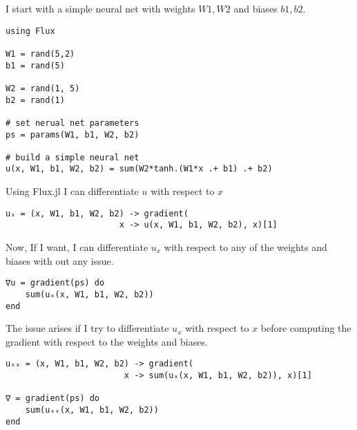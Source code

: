 \documentclass[12pt]{article}
\begin{document}
\begin{flushleft}

I start with a simple neural net with weights $W1, W2$ and biases $b1, b2$.
\begin{mdframed}[backgroundcolor=bg]
\begin{verbatim}
using Flux

W1 = rand(5,2)
b1 = rand(5)

W2 = rand(1, 5)
b2 = rand(1)

# set nerual net parameters
ps = params(W1, b1, W2, b2)

# build a simple neural net
u(x, W1, b1, W2, b2) = sum(W2*tanh.(W1*x .+ b1) .+ b2)

\end{verbatim}
\end{mdframed}

\vspace{0.25cm}

Using Flux.jl I can differentiate $u$ with respect to $x$ 
\vspace{0.25cm}

\begin{mdframed}[backgroundcolor=bg]
\begin{verbatim}
uₓ = (x, W1, b1, W2, b2) -> gradient(
                       x -> u(x, W1, b1, W2, b2), x)[1]
\end{verbatim}
\end{mdframed}

\vspace{0.25cm}

Now, If I want, I can differentiate $u_x$ with respect to any of the weights and biases with out any issue.
\vspace{0.25cm}

\begin{mdframed}[backgroundcolor=bg]
\begin{verbatim}
∇u = gradient(ps) do
    sum(uₓ(x, W1, b1, W2, b2))
end
\end{verbatim}
\end{mdframed}

\vspace{0.25cm}

The issue arises if I try to differentiate $u_x$ with respect to $x$ before computing the gradient with respect to the weights and biases.

\begin{mdframed}[backgroundcolor=bg]
\begin{verbatim}
uₓₓ = (x, W1, b1, W2, b2) -> gradient(
                        x -> sum(uₓ(x, W1, b1, W2, b2)), x)[1]

∇ = gradient(ps) do
    sum(uₓₓ(x, W1, b1, W2, b2))
end
\end{verbatim}
\end{mdframed}

\end{flushleft}
\end{document}
